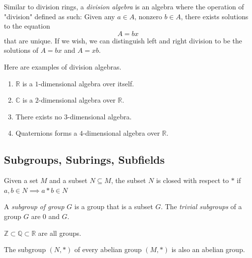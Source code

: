 \documentclass{article}
\begin{document}
    \begin{definition}
      Similar to division rings, a \textit{division algebra} is an algebra where the operation of "division" defined as such: Given any $a \in A$, nonzero $b \in A$, there exists solutions to the equation
      \begin{equation}
        A = bx
      \end{equation}
      that are unique. If we wish, we can distinguish left and right division to be the solutions of $A = b x$ and $A = x b$. 
    \end{definition}

    \begin{definition}
      Here are examples of division algebras.
      \begin{enumerate}
        \item $\mathbb{R}$ is a $1$-dimensional algebra over itself. 
        \item $\mathbb{C}$ is a $2$-dimensional algebra over $\mathbb{R}$. 
        \item There exists no $3$-dimensional algebra. 
        \item Quaternions forms a $4$-dimensional algebra over $\mathbb{R}$. 
      \end{enumerate}
    \end{definition}

  \subsection{Subgroups, Subrings, Subfields}

    \begin{definition}
      Given a set $M$ and a subset $N \subseteq M$, the subset $N$ is closed with respect to $*$ if $a, b \in N \implies a * b \in N$
    \end{definition}

    \begin{definition}
      A \textit{subgroup of group $G$} is a group that is a subset $G$. The \textit{trivial subgroups} of a group $G$ are $0$ and $G$. 
    \end{definition}

    \begin{example}
      $\mathbb{Z} \subset \mathbb{Q} \subset \mathbb{R}$ are all groups. 
    \end{example}

    \begin{theorem}
      The subgroup $(N, *)$ of every abelian group $(M, *)$ is also an abelian group. 
    \end{theorem}
\end{document}

